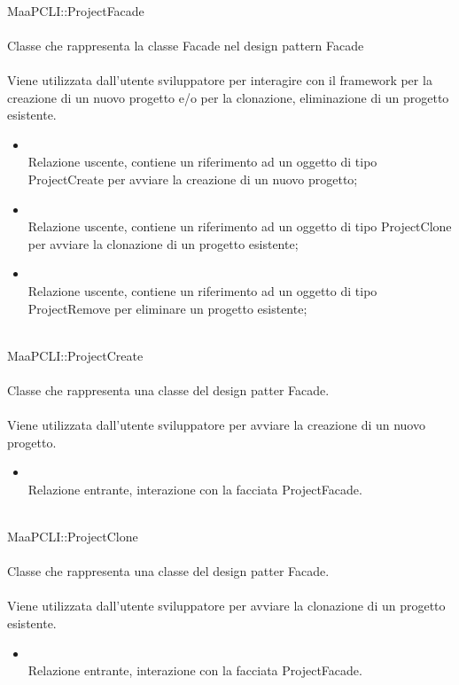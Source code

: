 	\\
	MaaPCLI::ProjectFacade\\
	\\
	Classe che rappresenta la classe Facade nel design pattern Facade\\
	\\
	Viene utilizzata dall'utente sviluppatore per interagire con il framework per la creazione di un nuovo progetto e/o per la clonazione, eliminazione di un progetto esistente.\\
	\begin{itemize}
	\item{}\\
	Relazione uscente, contiene un riferimento ad un oggetto di tipo ProjectCreate per avviare la creazione di un nuovo progetto;
	\item{}\\
	Relazione uscente, contiene un riferimento ad un oggetto di tipo ProjectClone per avviare la clonazione di un progetto esistente;
	\item{}\\
	Relazione uscente, contiene un riferimento ad un oggetto di tipo ProjectRemove per eliminare un progetto esistente;
	\end{itemize}
	
	\\
	MaaPCLI::ProjectCreate\\
	\\
	Classe che rappresenta una classe del design patter Facade.\\
	\\
	Viene utilizzata dall'utente sviluppatore per avviare la creazione di un nuovo progetto.\\
	\begin{itemize}
	\item{}\\
	Relazione entrante, interazione con la facciata ProjectFacade.
	\end{itemize}
	
	\\
	MaaPCLI::ProjectClone\\
	\\
	Classe che rappresenta una classe del design patter Facade.\\
	\\
	Viene utilizzata dall'utente sviluppatore per avviare la clonazione di un progetto esistente.\\
	\begin{itemize}
	\item{}\\
	Relazione entrante, interazione con la facciata ProjectFacade.
	\end{itemize}
	
